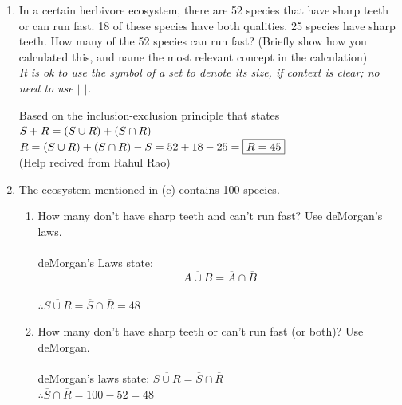\documentclass[12pt]{article}
\begin{document}
\begin{enumerate}
\begin{enumerate}
\item
In a certain herbivore ecosystem,  there are 52 species that have sharp teeth or can run fast. 
18 of these species have both qualities.  25 species have sharp teeth.  
How many of the 52 species can run fast? (Briefly show how you calculated this, and name the most relevant  concept in the calculation) \\
{\em It is ok to use the symbol of a set to denote its size, if context is clear; no need to use $|$ $|$.} \\
{\color{blue}

  Based on the inclusion-exclusion principle that states $S+R=(S\cup R)+(S\cap R)\\\\$
$
R=(S\cup R) + (S\cap R) - S \\
= 52 + 18 -25 \\
=\boxed{R = 45}
$\\
(Help recived from Rahul Rao)
}


\item
The ecosystem mentioned in (c)  contains  100 species.
\begin{enumerate}
\item
How many don't have sharp teeth and can't run fast?  Use  deMorgan's laws.\\\\
{\color{blue} deMorgan's Laws state: $$\overline{A\cup B} = \overline{A} \cap \overline{B}$$\\
  $
  \therefore \overline{S \cup R} = \overline{S} \cap \overline {R} = 48
  $
}

\item
How many  don't have sharp teeth or can't run fast (or both)?  Use deMorgan.\\\\

{\color {blue}
  deMorgan's laws state: $\overline{S\cup R} = \overline{S}\cap \overline{R}$ \\
  $\therefore \overline {S} \cap \overline {R} = 100-52=48$
}
\end{enumerate}


\end{enumerate}







\newpage
{}




\end{enumerate}
\end{document}
